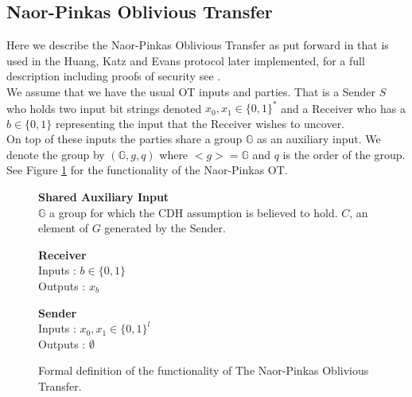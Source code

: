 \documentclass[ %
                    author={Nicholas Tutte},
                supervisor={Prof. Nigel Smart},
                    degree={MEng},
                     title={Secure Two Party Computation},
                  subtitle={A practical comparison of recent protocols},
                      type={Research - GG1K},
                      year={2015} ]{dissertation}
\begin{document}
			\subsection{Naor-Pinkas Oblivious Transfer} \label{sub:NaorPinkasOT}

				Here we describe the Naor-Pinkas Oblivious Transfer as put forward in \cite{Katz_Symm_CnC_2013} that is used in the Huang, Katz and Evans protocol later implemented, for a full description including proofs of security see \cite{NaorPinkasOT2001}.\\

				We assume that we have the usual OT inputs and parties. That is a Sender $S$ who holds two input bit strings denoted $x_0, x_1 \in \{0, 1\}^*$ and a Receiver who has a $b \in \{0, 1\}$ representing the  input that the Receiver wishes to uncover.\\

				On top of these inputs the parties share a group $\mathbb{G}$ as an auxiliary input. We denote the group by $(\mathbb{G}, g, q)$ where $<g> = \mathbb{G}$ and $q$ is the order of the group.\\ %

				See Figure \ref{fig:NPOT_Functionality} for the functionality of the Naor-Pinkas OT.\\


				\begin{figure}[!htb]
					\centering
					
					\textbf{Shared Auxiliary Input}\\
					$\mathbb{G}$ a group for which the CDH assumption is believed to hold. $C$, an element of $G$ generated by the Sender.\\
					\vspace{0.3cm}
					\begin{minipage}{0.45\textwidth}
						\centering
						\textbf{Receiver}\\
						Inputs : $b \in \{0, 1\}$\\
						Outputs : $x_b$\\
					\end{minipage}
					\begin{minipage}{0.45\textwidth}
						\centering
						\textbf{Sender}\\
						Inputs : $x_0, x_1 \in \{0, 1\}^l$\\
						Outputs : $\emptyset$\\
					\end{minipage}

					\caption{ Formal definition of the functionality of The Naor-Pinkas Oblivious Transfer.\label{fig:NPOT_Functionality}}
				\end{figure}
\end{document}
